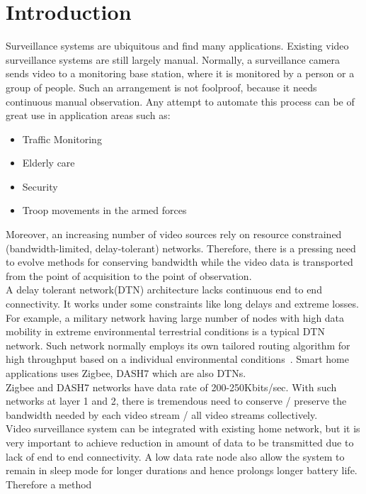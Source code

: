 
\chapter{Introduction} %
\label{Chapter1}
\indent Surveillance systems are ubiquitous and find many applications.
Existing video surveillance systems are still largely manual.
Normally, a surveillance camera sends video to a monitoring base
station, where it is monitored by a person or a group of people. Such an
arrangement is not foolproof, because it needs continuous manual
observation. Any attempt to automate this process can be of
great use in application areas such as:
\begin{itemize}
 \item Traffic Monitoring
 \item Elderly care
 \item Security
 \item Troop movements in the armed forces
\end{itemize}
\indent Moreover, an increasing number of video sources rely on resource
constrained (bandwidth-limited, delay-tolerant) networks. Therefore,
there is a pressing need to evolve methods for conserving bandwidth
while the video data is transported from the point of acquisition to the
point of observation.\\ 
\indent A delay tolerant network(DTN) architecture lacks continuous end
to end connectivity. It works under some constraints like long delays
and extreme losses. For example, a military network having large number
of nodes with high data mobility in extreme environmental terrestrial
conditions is a typical DTN network. Such network normally employs its
own tailored routing algorithm for high throughput based on a individual
environmental conditions~\cite{1}. Smart home applications uses Zigbee,
DASH7 which are also DTNs.\\
\indent Zigbee and DASH7 networks have data rate of 200-250Kbits/sec.
With such networks at layer 1 and 2, there is tremendous need to conserve /
preserve the bandwidth needed by each video stream / all video streams
collectively.\\
\indent Video surveillance system can be integrated with existing home
network, but it is very important to achieve reduction in amount of
data to be transmitted due to lack of end to end connectivity. A low
data rate node also allow the system to remain in sleep mode for longer
durations and hence prolongs longer battery life. Therefore a method
